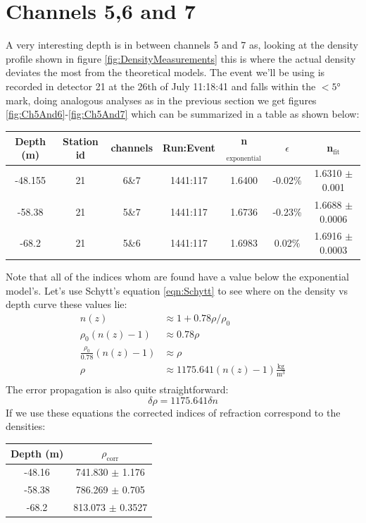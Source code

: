 \section{Channels 5,6 and 7}
A very interesting depth is in between channels 5 and 7 as, looking
at the density profile shown in figure \ref{fig:DensityMeasurements}
this is where the actual density deviates the most from the
theoretical models.  The event we'll be using is recorded in
detector 21 at the 26th of July 11:18:41 and falls within the $<5$°
mark, doing analogous analyses as in the previous section we get
figures \ref{fig:Ch5And6}-\ref{fig:Ch5And7} which can be summarized in a table as shown below:
\begin{center}
\begin{tabular}{||c c c c c c c||}
 \hline
 Depth (m) & Station id & channels & Run:Event & n$_\text{exponential}$ & $\epsilon$ & n$_\text{fit}$\\ [0.5ex]
 \hline\hline
 -48.155 & 21 & 6\&7 & 1441:117 & 1.6400 & -0.02\% & 1.6310 $\pm$ 0.001 \\
 -58.38 & 21 & 5\&7 & 1441:117 & 1.6736 & -0.23\% & 1.6688 $\pm$ 0.0006 \\
 -68.2 & 21 & 5\&6 & 1441:117 & 1.6983 & 0.02\% & 1.6916 $\pm$ 0.0003 \\
 \hline
\end{tabular}
\end{center}
Note that all of the indices whom are found have a value below the
exponential model's.  Let's use Schytt's equation \ref{eqn:Schytt}
to see where on the density vs depth curve these values lie:
\begin{align}
	n(z) &\approx 1 + 0.78\rho/\rho_0\\
	\rho_0(n(z) - 1) &\approx 0.78\rho\\
	\frac{\rho_0}{0.78}(n(z) - 1) &\approx \rho\\
	\rho &\approx 1175.641(n(z) - 1)\frac{\text{kg}}{\text{m}^3}\\
\end{align}
The error propagation is also quite straightforward:
\begin{equation}
	\delta \rho = 1175.641\delta n
\end{equation}
If we use these equations the corrected indices of refraction
correspond to the densities:
\begin{center}
\begin{tabular}{||c c||}
 \hline
 Depth (m) & $\rho_\text{corr}$\\ [0.5ex]
 \hline\hline
 -48.16 & 741.830 $\pm$ 1.176 \\
 -58.38 & 786.269 $\pm$ 0.705 \\
 -68.2 & 813.073 $\pm$ 0.3527 \\
 \hline
\end{tabular}
\end{center}
